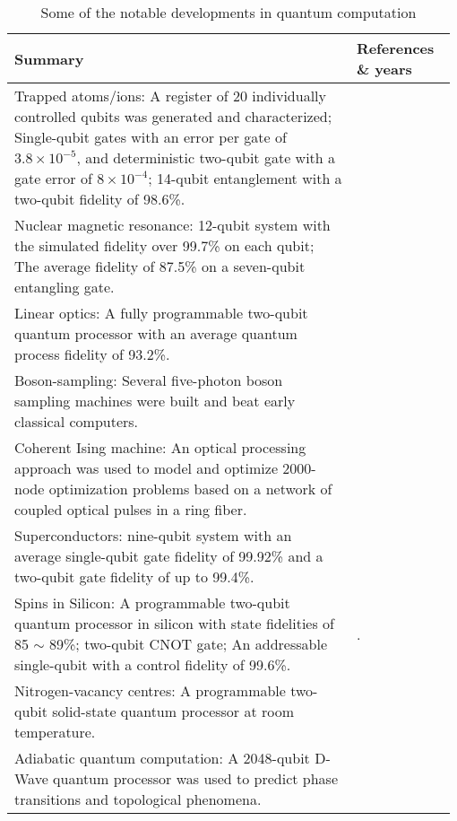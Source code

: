 \begin{table*}[!htbp]
	\begin{tabular}{|p{0.755\linewidth}|p{0.22\linewidth}|}
		\hline
		Summary & References \& years \\
		\hline \hline
		Trapped atoms/ions: A register of 20 individually controlled qubits was generated and characterized; Single-qubit gates with an error per gate of $3.8 \times {10^{ - 5}}$, and deterministic two-qubit gate with a gate error of $8 \times {10^{ - 4}}$; 14-qubit entanglement with a two-qubit fidelity of 98.6\%. & \cite{bib:friis2018observation, bib:Gaebler2016, bib:monz2011} \\
		\hline
		Nuclear magnetic resonance: 12-qubit system with the simulated fidelity over 99.7\% on each qubit; The average fidelity of 87.5\% on a seven-qubit entangling gate. & \cite{bib:Negrevergne2006, bib:lu2017enhancing, bib:Lu2015} \\
		\hline
		Linear optics: A fully programmable two-qubit quantum processor with an average quantum process fidelity of 93.2\%. & \cite{bib:qiang2018large} \\
		\hline
		Boson-sampling: Several five-photon boson sampling machines were built and beat early classical computers. & \cite{bib:zhong201812, bib:wang2018toward, bib:wang2017high} \\
		\hline
		Coherent Ising machine: An optical processing approach was used to model and optimize 2000-node optimization problems based on a network of coupled optical pulses in a ring fiber. & \cite{bib:mcmahon2016fully, bib:inagaki2016coherent} \\
		\hline
		Superconductors: nine-qubit system with an average single-qubit gate fidelity of 99.92\% and a two-qubit gate fidelity of up to 99.4\%. & \cite{bib:kelly2015state, bib:barends2014superconducting} \\
		\hline
		Spins in Silicon: A programmable two-qubit quantum processor in silicon with state fidelities of 85 $\sim$ 89\%; two-qubit CNOT gate; An addressable single-qubit with a control fidelity of 99.6\%. & \cite{bib:watson2018programmable, bib:veldhorst2015two, bib:veldhorst2014addressable}. \\
		\hline
		Nitrogen-vacancy centres: A programmable two-qubit solid-state quantum processor at room temperature. & \cite{bib:wu2018programmable} \\
		\hline
		Adiabatic quantum computation: A 2048-qubit D-Wave quantum processor was used to predict phase transitions and topological phenomena. & \cite{bib:harris2018phase, bib:king2018observation} \\
		\hline
	\end{tabular}
	\captionspacetab \caption{Some of the notable developments in quantum computation} \label{tab:quantumcomputer}
\end{table*}

